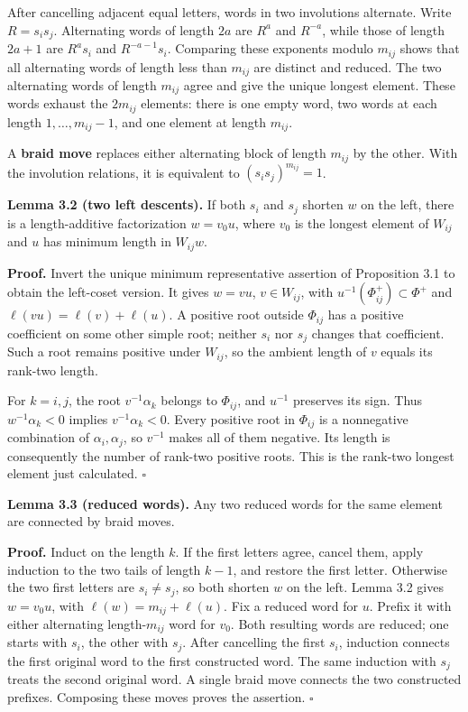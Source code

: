 \documentclass[11pt,a4paper,openany]{report}
\begin{document}
After cancelling adjacent equal letters, words in two involutions alternate. Write \(R=s_i s_j\). Alternating words of length \(2a\) are \(R^a\) and \(R^{-a}\), while those of length \(2a+1\) are \(R^a s_i\) and \(R^{-a-1}s_i\). Comparing these exponents modulo \(m_{ij}\) shows that all alternating words of length less than \(m_{ij}\) are distinct and reduced. The two alternating words of length \(m_{ij}\) agree and give the unique longest element. These words exhaust the \(2m_{ij}\) elements: there is one empty word, two words at each length \(1,\ldots,m_{ij}-1\), and one element at length \(m_{ij}\).

A \textbf{braid move} replaces either alternating block of length \(m_{ij}\) by the other. With the involution relations, it is equivalent to \((s_i s_j)^{m_{ij}}=1\).

\textbf{Lemma 3.2 (two left descents).} If both \(s_i\) and \(s_j\) shorten \(w\) on the left, there is a length-additive factorization \(w=v_0u\), where \(v_0\) is the longest element of \(W_{ij}\) and \(u\) has minimum length in \(W_{ij}w\).

\textbf{Proof.} Invert the unique minimum representative assertion of Proposition 3.1 to obtain the left-coset version. It gives \(w=vu\), \(v\in W_{ij}\), with \(u^{-1}(\Phi_{ij}^+)\subset\Phi^+\) and \(\ell(vu)=\ell(v)+\ell(u)\). A positive root outside \(\Phi_{ij}\) has a positive coefficient on some other simple root; neither \(s_i\) nor \(s_j\) changes that coefficient. Such a root remains positive under \(W_{ij}\), so the ambient length of \(v\) equals its rank-two length.

For \(k=i,j\), the root \(v^{-1}\alpha_k\) belongs to \(\Phi_{ij}\), and \(u^{-1}\) preserves its sign. Thus \(w^{-1}\alpha_k<0\) implies \(v^{-1}\alpha_k<0\). Every positive root in \(\Phi_{ij}\) is a nonnegative combination of \(\alpha_i,\alpha_j\), so \(v^{-1}\) makes all of them negative. Its length is consequently the number of rank-two positive roots. This is the rank-two longest element just calculated. \(\square\)

\textbf{Lemma 3.3 (reduced words).} Any two reduced words for the same element are connected by braid moves.

\textbf{Proof.} Induct on the length \(k\). If the first letters agree, cancel them, apply induction to the two tails of length \(k-1\), and restore the first letter. Otherwise the two first letters are \(s_i\ne s_j\), so both shorten \(w\) on the left. Lemma 3.2 gives \(w=v_0u\), with \(\ell(w)=m_{ij}+\ell(u)\). Fix a reduced word for \(u\). Prefix it with either alternating length-\(m_{ij}\) word for \(v_0\). Both resulting words are reduced; one starts with \(s_i\), the other with \(s_j\). After cancelling the first \(s_i\), induction connects the first original word to the first constructed word. The same induction with \(s_j\) treats the second original word. A single braid move connects the two constructed prefixes. Composing these moves proves the assertion. \(\square\)
\end{document}
